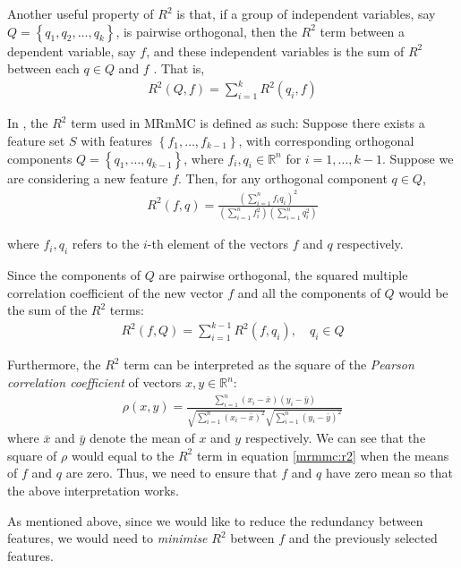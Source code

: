 \documentclass[12pt, twoside, a4paper]{report}
\begin{document}
Another useful property of $R^2$ is that, if a group of independent variables, say $Q=\left\lbrace q_1, q_2, \dots, q_k \right\rbrace$, is pairwise orthogonal, then the $R^2$ term between a dependent variable, say $f$, and these independent variables is the sum of $R^2$ between each $q \in Q$ and $f$ \cite{RefWorks:193}. That is,
\begin{align*}
R^2(Q, f) = \sum_{i=1}^k R^2(q_i, f)
\end{align*}

In \cite{RefWorks:187}, the $R^2$ term used in MRmMC is defined as such: Suppose there exists a feature set $S$ with features $\left\lbrace f_1 , \dots , f_{k-1} \right\rbrace$, with corresponding orthogonal components $Q= \left\lbrace q_1, \dots , q_{k-1} \right\rbrace$, where $f_i, q_i \in \mathbb{R}^n$ for $i=1, \dots, k-1$. Suppose we are considering a new feature $f$. Then, for any orthogonal component $q \in Q$,
\begin{align}
R^2(f, q) = \frac{\left( \sum_{i=1}^n f_iq_i \right)^2}{\left(\sum_{i=1}^n f_i^2 \right) \left( \sum_{i=1}^n q_i^2 \right)} \label{mrmmc:r2}
\end{align}

where $f_i,q_i$ refers to the $i$-th element of the vectors $f$ and $q$ respectively.

Since the components of $Q$ are pairwise orthogonal, the squared multiple correlation coefficient of the new vector $f$ and all the components of $Q$ would be the sum of the $R^2$ terms:
\begin{align*}
R^2(f, Q) = \sum_{i=1}^{k-1} R^2(f, q_i), \quad q_i \in Q
\end{align*}

Furthermore, the $R^2$ term can be interpreted as the square of the \textit{Pearson correlation coefficient} of vectors $x,y \in \mathbb{R}^n$:
\begin{align*}
\rho(x, y) = \frac{\sum_{i=1}^n (x_i - \bar{x})(y_i - \bar{y})}{\sqrt{\sum_{i=1}^n (x_i-\bar{x})^2}\sqrt{\sum_{i=1}^n (y_i-\bar{y})^2}}
\end{align*}
where $\bar{x}$ and $\bar{y}$ denote the mean of $x$ and $y$ respectively. We can see that the square of $\rho$ would equal to the $R^2$ term in equation \ref{mrmmc:r2} when the means of $f$ and $q$ are zero. Thus, we need to ensure that $f$ and $q$ have zero mean so that the above interpretation works.

As mentioned above, since we would like to reduce the redundancy between features, we would need to \textit{minimise} $R^2$ between $f$ and the previously selected features.\\
\end{document}
